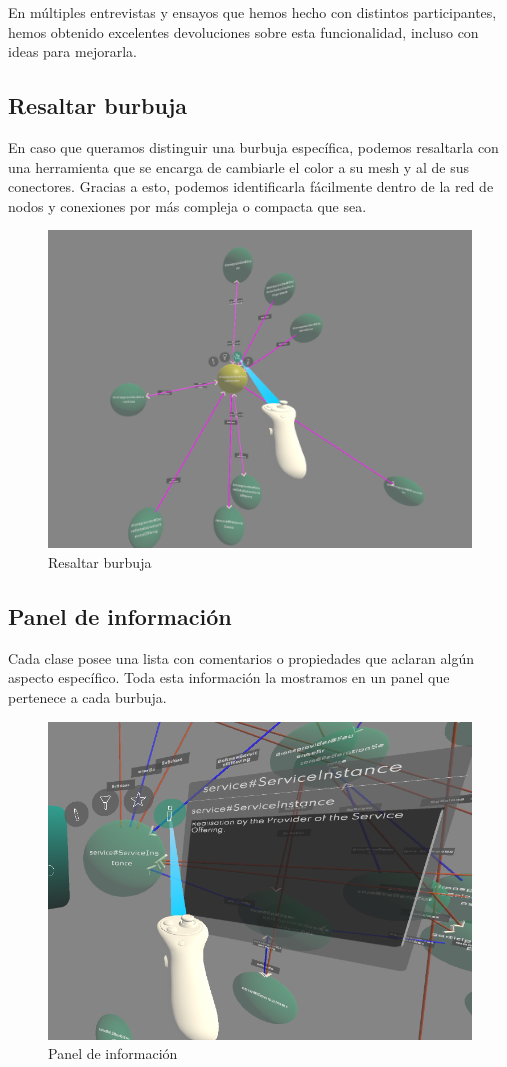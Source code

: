 En múltiples entrevistas y ensayos que hemos hecho con distintos participantes, hemos obtenido excelentes devoluciones sobre esta funcionalidad, incluso con ideas para mejorarla.

\subsection{Resaltar burbuja}

En caso que queramos distinguir una burbuja específica, podemos resaltarla con una herramienta que se encarga de cambiarle el color a su mesh y al de sus conectores. Gracias a esto, podemos identificarla fácilmente dentro de la red de nodos y conexiones por más compleja o compacta que sea.

\begin{figure}[ht]
   \begin{center}
      \includegraphics[width=0.55\linewidth]{chapter2/figures/highlight_tool.png}
   \end{center}
   \caption[Resaltar burbuja]
   {\footnotesize Resaltar burbuja}
\end{figure}

\subsection{Panel de información}

Cada clase posee una lista con comentarios o propiedades que aclaran algún aspecto específico. Toda esta información la mostramos en un panel que pertenece a cada burbuja.

\begin{figure}[ht]
   \begin{center}
      \includegraphics[width=0.55\linewidth]{chapter2/figures/informationPanel.png}
   \end{center}
   \caption[Panel de información]
   {\footnotesize Panel de información}
\end{figure}

